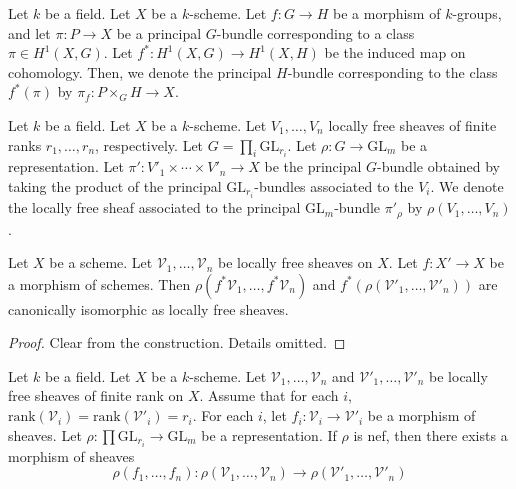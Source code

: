 \begin{definition}
Let $k$ be a field.
Let $X$ be a $k$-scheme.
Let $f:G\to H$ be a morphism of $k$-groups, and let $\pi:P\to X$ be a principal
$G$-bundle corresponding to a class $\pi\in H^1(X,G)$.
Let $f^{*}:H^1(X,G)\to H^1(X,H)$ be the induced map on cohomology.
Then, we denote the principal $H$-bundle corresponding to the class
$f^{*}(\pi)$ by $\pi_f:P\times_{G}H\to X$.
\end{definition}

\begin{definition}
Let $k$ be a field.
Let $X$ be a $k$-scheme.
Let $V_1,\ldots,V_n$ locally free sheaves of finite ranks $r_1,\ldots,r_n$,
respectively.
Let $G = \prod_i \mathrm{GL}_{r_i}$.
Let $\rho : G \to \mathrm{GL}_m$ be a representation.
Let $\pi': V'_1 \times \cdots \times V'_n \to X$ be the principal $G$-bundle
obtained by taking the product of the principal $\mathrm{GL}_{r_i}$-bundles
associated to the $V_i$.
We denote the locally free sheaf associated to the principal
$\mathrm{GL}_m$-bundle $\pi'_\rho$ by $\rho(V_1,\ldots,V_n)$.
\end{definition}

\begin{lemma}\label{pullback_and_rho_commute}
Let $X$ be a scheme.
Let $\mathcal{V}_1,\ldots,\mathcal{V}_n$ be locally free sheaves on $X$.
Let $f: X' \to X$ be a morphism of schemes.
Then $\rho(f^*\mathcal{V}_1,\ldots,f^*\mathcal{V}_n)$ and
$f^*(\rho(\mathcal{V}'_1,\ldots,\mathcal{V}'_n))$ are canonically isomorphic as
locally free sheaves.
\end{lemma}

\begin{proof}
Clear from the construction. Details omitted.
\end{proof}


\begin{lemma}\label{functoriality_rho}
Let $k$ be a field.
Let $X$ be a $k$-scheme.
Let
$\mathcal{V}_1,\ldots,\mathcal{V}_n$
and
$\mathcal{V}'_1,\ldots,\mathcal{V}'_n$
be locally free sheaves of finite rank on $X$.
Assume that for each $i$,
$\mathrm{rank}(\mathcal{V}_i) = \mathrm{rank}(\mathcal{V}'_i) = r_i$.
For each $i$, let $f_i : \mathcal{V}_i \to \mathcal{V}'_i$ be a morphism
of sheaves.
Let $\rho : \prod \mathrm{GL}_{r_i} \to \mathrm{GL}_m$ be a representation.
If $\rho$ is nef, then there exists a morphism of sheaves
$$
  \rho(f_1,\dots, f_n) :
    \rho(\mathcal{V}_1,\ldots,\mathcal{V}_n) \to
    \rho(\mathcal{V}'_1,\dots,\mathcal{V}'_n)
$$
\end{lemma}

